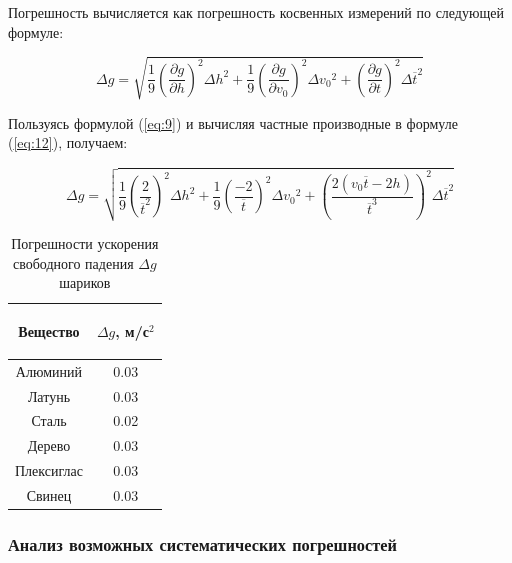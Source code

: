Погрешность вычисляется как погрешность косвенных измерений по следующей формуле:

\begin{equation}
\label{eq:12}
   \Delta g = \sqrt{ \frac{1}{9} \left(\frac{\partial g}{\partial h}\right)^2 \Delta{h}^2 +
   \frac{1}{9} \left(\frac{\partial g}{\partial v_0}\right)^2 \Delta{v_0}^2 +
   \left(\frac{\partial g}{\partial t}\right)^2 \Delta{\overline{t}}^2}
\end{equation}

Пользуясь формулой (\ref{eq:9}) и вычисляя частные производные в формуле (\ref{eq:12}), получаем:

\begin{equation}
\label{eq:13}
   \Delta g = \sqrt{ \frac{1}{9} \left(\frac{2}{\overline{t}^2}\right)^2 \Delta{h}^2 +
   \frac{1}{9} \left(\frac{-2}{\overline{t}}\right)^2 \Delta{v_0}^2 +
   \left(\frac{2(v_0\overline{t}-2h)}{\overline{t}^3}\right)^2 \Delta{\overline{t}}^2}
\end{equation}

\begin{center}
\begin{table}[H]
\centering
\caption{Погрешности ускорения свободного падения $\Delta g$ шариков}
\label{tabl:5}
\renewcommand{\arraystretch}{1.15}
\begin{tabular}{|c|c|}
\hline
\begin{minipage}{5cm}
\begin{center}
    Вещество 
\end{center}
\end{minipage} & 
\begin{minipage}{5cm}
\begin{center}
    $\Delta g$, м/с$^2$ 
\end{center}
\end{minipage} \\
\hline
Алюминий   & 0.03 \\
Латунь     & 0.03 \\
Сталь      & 0.02 \\
Дерево     & 0.03 \\
Плексиглас & 0.03 \\
Свинец     & 0.03 \\
\hline
\end{tabular}
\end{table}
\end{center}

\subsubsection{Анализ возможных систематических погрешностей}

